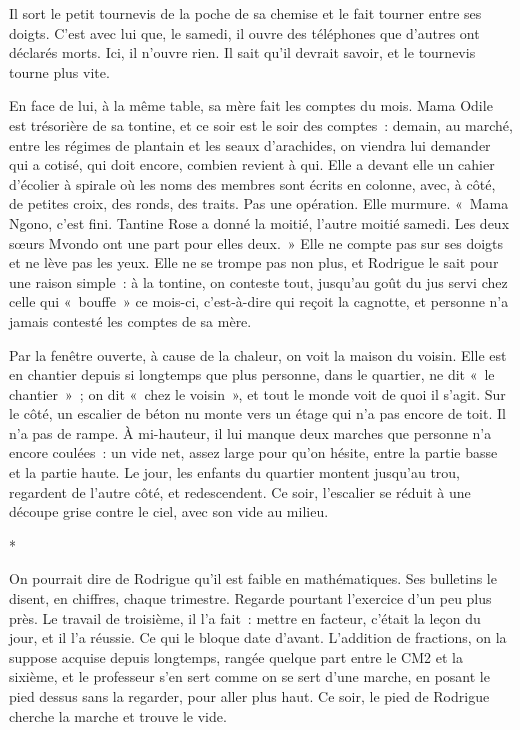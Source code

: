 \documentclass[10.5pt,twoside,openright]{book}
\newcommand{\asterisme}{\par\vspace{0.7em}\centerline{\color{gris}*\quad*\quad*}\vspace{0.7em}\par\noindent}
\begin{document}
Il sort le petit tournevis de la poche de sa chemise et le fait tourner entre ses doigts. C’est avec lui que, le samedi, il ouvre des téléphones que d’autres ont déclarés morts. Ici, il n’ouvre rien. Il sait qu’il devrait savoir, et le tournevis tourne plus vite.

En face de lui, à la même table, sa mère fait les comptes du mois. Mama Odile est trésorière de sa tontine, et ce soir est le soir des comptes : demain, au marché, entre les régimes de plantain et les seaux d’arachides, on viendra lui demander qui a cotisé, qui doit encore, combien revient à qui. Elle a devant elle un cahier d’écolier à spirale où les noms des membres sont écrits en colonne, avec, à côté, de petites croix, des ronds, des traits. Pas une opération. Elle murmure. « Mama Ngono, c’est fini. Tantine Rose a donné la moitié, l’autre moitié samedi. Les deux sœurs Mvondo ont une part pour elles deux. » Elle ne compte pas sur ses doigts et ne lève pas les yeux. Elle ne se trompe pas non plus, et Rodrigue le sait pour une raison simple : à la tontine, on conteste tout, jusqu’au goût du jus servi chez celle qui « bouffe » ce mois-ci, c’est-à-dire qui reçoit la cagnotte, et personne n’a jamais contesté les comptes de sa mère.

Par la fenêtre ouverte, à cause de la chaleur, on voit la maison du voisin. Elle est en chantier depuis si longtemps que plus personne, dans le quartier, ne dit « le chantier » ; on dit « chez le voisin », et tout le monde voit de quoi il s’agit. Sur le côté, un escalier de béton nu monte vers un étage qui n’a pas encore de toit. Il n’a pas de rampe. À mi-hauteur, il lui manque deux marches que personne n’a encore coulées : un vide net, assez large pour qu’on hésite, entre la partie basse et la partie haute. Le jour, les enfants du quartier montent jusqu’au trou, regardent de l’autre côté, et redescendent. Ce soir, l’escalier se réduit à une découpe grise contre le ciel, avec son vide au milieu.

\asterisme

On pourrait dire de Rodrigue qu’il est faible en mathématiques. Ses bulletins le disent, en chiffres, chaque trimestre. Regarde pourtant l’exercice d’un peu plus près. Le travail de troisième, il l’a fait : mettre en facteur, c’était la leçon du jour, et il l’a réussie. Ce qui le bloque date d’avant. L’addition de fractions, on la suppose acquise depuis longtemps, rangée quelque part entre le CM2 et la sixième, et le professeur s’en sert comme on se sert d’une marche, en posant le pied dessus sans la regarder, pour aller plus haut. Ce soir, le pied de Rodrigue cherche la marche et trouve le vide.
\end{document}

